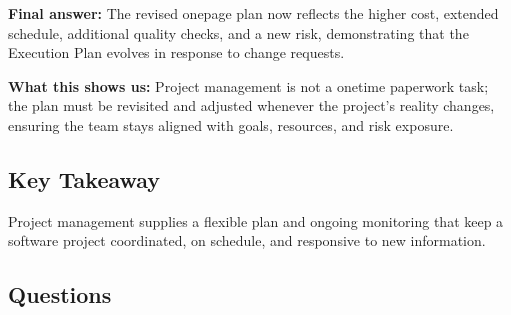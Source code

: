 \documentclass[12pt, a4paper]{article}
\begin{document}
\textbf{Final answer:}  The revised onepage plan now reflects the higher cost, extended schedule, additional quality checks, and a new risk, demonstrating that the Execution Plan evolves in response to change requests.

\textbf{What this shows us:}  Project management is not a onetime paperwork task; the plan must be revisited and adjusted whenever the project's reality changes, ensuring the team stays aligned with goals, resources, and risk exposure.

\subsection{Key Takeaway}
Project management supplies a flexible plan and ongoing monitoring that keep a software project coordinated, on schedule, and responsive to new information.

\subsection*{Questions}
\end{document}
